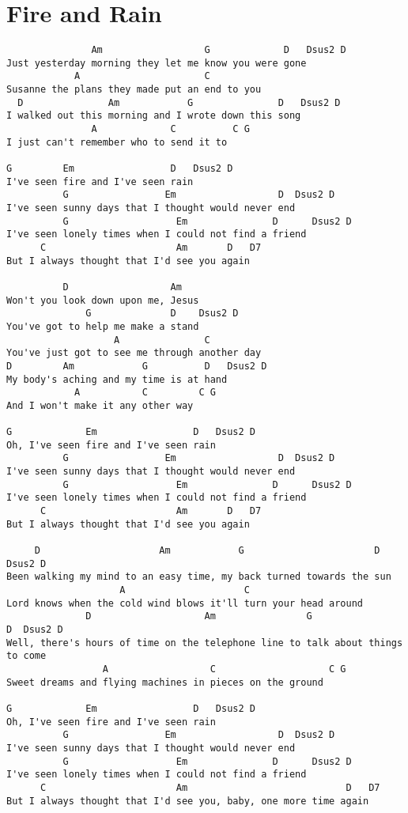 \documentclass[leqno]{memoir}
\begin{document}
\chapter{Fire and Rain}
\begin{verbatim}
               Am                  G             D   Dsus2 D
Just yesterday morning they let me know you were gone 
            A                      C
Susanne the plans they made put an end to you 
  D               Am            G               D   Dsus2 D
I walked out this morning and I wrote down this song 
               A             C          C G
I just can't remember who to send it to 

G         Em                 D   Dsus2 D
I've seen fire and I've seen rain 
          G                 Em                  D  Dsus2 D
I've seen sunny days that I thought would never end 
          G                   Em               D      Dsus2 D
I've seen lonely times when I could not find a friend 
      C                       Am       D   D7
But I always thought that I'd see you again 

          D                  Am
Won't you look down upon me, Jesus 
              G              D    Dsus2 D
You've got to help me make a stand 
                   A               C
You've just got to see me through another day 
D         Am            G          D   Dsus2 D
My body's aching and my time is at hand 
            A           C         C G
And I won't make it any other way 

G             Em                 D   Dsus2 D
Oh, I've seen fire and I've seen rain 
          G                 Em                  D  Dsus2 D
I've seen sunny days that I thought would never end 
          G                   Em               D      Dsus2 D
I've seen lonely times when I could not find a friend 
      C                       Am       D   D7
But I always thought that I'd see you again 

     D                     Am            G                       D  Dsus2 D
Been walking my mind to an easy time, my back turned towards the sun 
                    A                     C
Lord knows when the cold wind blows it'll turn your head around 
              D                    Am                G                     D  Dsus2 D
Well, there's hours of time on the telephone line to talk about things to come 
                 A                  C                    C G 
Sweet dreams and flying machines in pieces on the ground 

G             Em                 D   Dsus2 D
Oh, I've seen fire and I've seen rain 
          G                 Em                  D  Dsus2 D
I've seen sunny days that I thought would never end 
          G                   Em               D      Dsus2 D
I've seen lonely times when I could not find a friend 
      C                       Am                            D   D7
But I always thought that I'd see you, baby, one more time again 


\end{verbatim}
\end{document}
